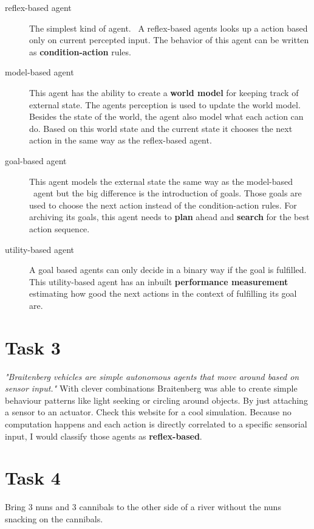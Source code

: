 \documentclass{article}
\begin{document}
\begin{description}
    \item[reflex-based agent] 
    The simplest kind of agent. \
    A reflex-based agents looks up a action based only on current percepted input. 
    The behavior of this agent can be written as \textbf{condition-action} rules.
    
    \item[model-based agent] 
    This agent has the ability to create a \textbf{world model} for keeping track of external state.
    The agents perception is used to update the world model. Besides the state of the world, 
    the agent also model what each action can do. Based on this world state and the current 
    state it chooses the next action in the same way as the reflex-based agent.

    \item[goal-based agent] This agent models the external state the same way as the model-based \
    agent but the big difference is the introduction of goals. Those goals are used to
    choose the next action instead of the condition-action rules. For archiving its goals,
    this agent needs to \textbf{plan} ahead and \textbf{search} for the best action sequence.
 
    \item[utility-based agent]
     A goal based agents can only decide in a binary way if the goal is fulfilled. 
     This utility-based agent has an inbuilt \textbf{performance measurement} estimating how good the next 
     actions in the context of fulfilling its goal are.
  \end{description}


\section*{Task 3}
\emph{"Braitenberg vehicles are simple autonomous agents that move around based on sensor input."}\cite{harmendeweerd:1} With clever combinations
 Braitenberg was able to create simple behaviour patterns like light seeking or circling around objects. 
 By just attaching a sensor to an actuator. Check this website for a cool simulation\cite{harmendeweerd:1}. 
 Because no computation happens and each action is directly correlated to a specific sensorial input, 
 I would classify those agents as \textbf{reflex-based}.

\section*{Task 4}
Bring 3 nuns and 3 cannibals to the other side of a river without the nuns snacking on the cannibals. 
\end{document}
